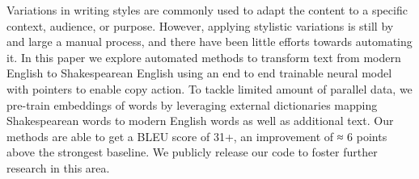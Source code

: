 Variations in writing styles are commonly used to adapt the content to a specific context, audience, or purpose. However, applying stylistic variations is still by and large a manual process, and there have been little efforts towards automating it. In this paper we explore automated methods to transform text from modern English to Shakespearean English using an end to end trainable neural model with pointers to enable copy action. To tackle limited amount of parallel data, we pre-train embeddings of words by leveraging external dictionaries mapping Shakespearean words to modern English words as well as additional text. Our methods are able to get a BLEU score of 31+, an improvement of ≈ 6 points above the strongest baseline. We publicly release our code to foster further research in this area.

